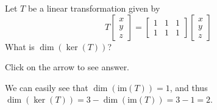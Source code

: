 \documentclass{ximera}
\begin{document}
\begin{problem}\label{prb:6.31}
 Let $T$ be a linear transformation given by
\[
T \left[ \begin{array}{r}
x\\
y \\
z
\end{array}\right] = \left[ \begin{array}{rrr}
1 & 1 & 1 \\
1 & 1 & 1
\end{array}\right]
\left[ \begin{array}{r}
x\\
y \\
z
\end{array}\right]
\]
What is $\dim  ( \ker \left( T \right) )$?

Click on the arrow to see answer.
\begin{expandable}
We can easily see that $\dim  ( \mbox{im} \left( T \right) ) =1$, and thus
$\dim  ( \ker \left( T \right) ) = 3 - \dim  ( \mbox{im} \left( T \right) ) = 3- 1 = 2$.
\end{expandable}
\end{problem}
\end{document}
